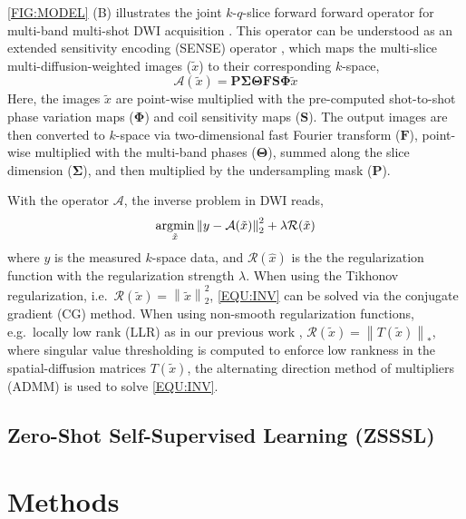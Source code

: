 \documentclass[journal,twoside,web]{ieeecolor}
\newcommand{\argmin}{\operatornamewithlimits{argmin}}
\newcommand{\norm}[1]{\left\lVert#1\right\rVert}
\begin{document}
    \cref{FIG:MODEL} (B) illustrates the joint $k$-$q$-slice forward forward operator
    for multi-band multi-shot DWI acquisition \cite{tan_2024_naviepi}.
    This operator can be understood as
    an extended sensitivity encoding (SENSE) operator \cite{pruessmann_2001_gsense},
    which maps the multi-slice multi-diffusion-weighted images ($\tilde{x}$)
    to their corresponding $k$-space,
    \begin{equation}
        \mathcal{A}(\tilde{x}) = \mathbf{P \Sigma \Theta F S \Phi} \tilde{x}
        \label{EQU:FWD}
    \end{equation}
    Here, the images $\tilde{x}$ are point-wise multiplied
    with the pre-computed shot-to-shot phase variation maps ($\mathbf{\Phi}$)
    and coil sensitivity maps ($\mathbf{S}$).
    The output images are then converted to $k$-space
    via two-dimensional fast Fourier transform ($\mathbf{F}$),
    point-wise multiplied with the multi-band phases ($\mathbf{\Theta}$),
    summed along the slice dimension ($\mathbf{\Sigma}$),
    and then multiplied by the undersampling mask ($\mathbf{P}$).

    With the operator $\mathcal{A}$, the inverse problem in DWI reads,
    \begin{equation}
        \argmin_{\tilde{x}} \norm{y - \mathcal{A}(\tilde{x})}_2^2 + \lambda \mathcal{R}(\tilde{x})
        \label{EQU:INV}
    \end{equation}
    where $y$ is the measured $k$-space data,
    and $\mathcal{R}(\hat{x})$ is the the regularization function
    with the regularization strength $\lambda$.
    When using the Tikhonov regularization,
    i.e.~$\mathcal{R}(\tilde{x}) = \norm{\tilde{x}}_2^2$,
    \cref{EQU:INV} can be solved via the conjugate gradient (CG) method.
    When using non-smooth regularization functions,
    e.g.~locally low rank (LLR) as in our previous work \cite{tan_2024_naviepi},
    $\mathcal{R}(\tilde{x}) = \norm{T(\tilde{x})}_*$,
    where singular value thresholding \cite{cai_2010_svt} is computed
    to enforce low rankness in the spatial-diffusion matrices $T(\tilde{x})$,
    the alternating direction method of multipliers (ADMM) \cite{boyd_2010_admm}
    is used to solve \cref{EQU:INV}.


    \subsection{Zero-Shot Self-Supervised Learning (ZSSSL)}


	\section{Methods}
\end{document}
